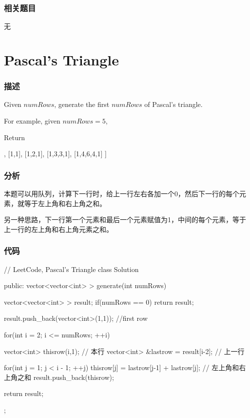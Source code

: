 \subsubsection{相关题目}

\begindot
\item 无
\myenddot


\section{Pascal's Triangle} %
\label{sec:pascals-triangle}


\subsubsection{描述}
Given $numRows$, generate the first $numRows$ of Pascal's triangle.

For example, given $numRows = 5$,

Return
\begin{Code}
[
     [1],
    [1,1],
   [1,2,1],
  [1,3,3,1],
 [1,4,6,4,1]
]
\end{Code}


\subsubsection{分析}
本题可以用队列，计算下一行时，给上一行左右各加一个0，然后下一行的每个元素，就等于左上角和右上角之和。

另一种思路，下一行第一个元素和最后一个元素赋值为1，中间的每个元素，等于上一行的左上角和右上角元素之和。


\subsubsection{代码}

\begin{Code}
// LeetCode, Pascal's Triangle
class Solution {
public:
    vector<vector<int> > generate(int numRows) {
        vector<vector<int> > result;
        if(numRows == 0) return result;

        result.push_back(vector<int>(1,1)); //first row

        for(int i = 2; i <= numRows; ++i) {
            vector<int> thisrow(i,1);  // 本行
            vector<int> &lastrow = result[i-2];  // 上一行

            for(int j = 1; j < i - 1; ++j) {
                thisrow[j] = lastrow[j-1] + lastrow[j]; // 左上角和右上角之和
            }
            result.push_back(thisrow);
        }
        return result;
    }
};
\end{Code}



